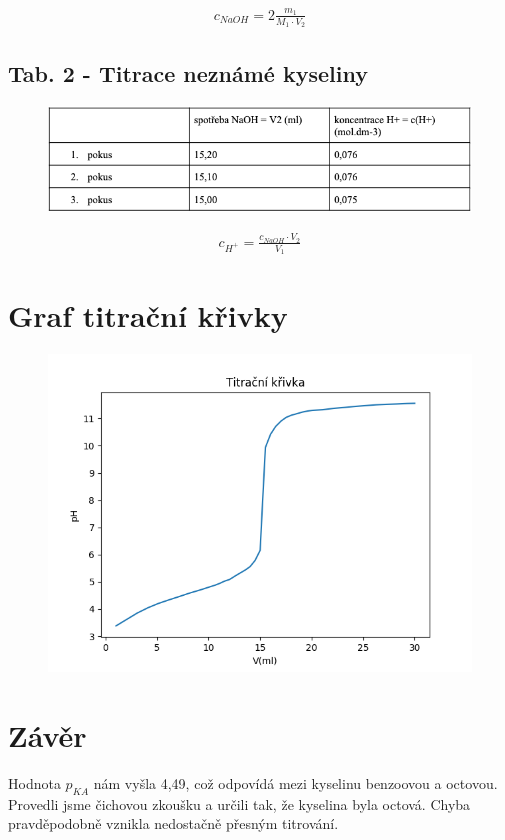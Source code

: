 \documentclass[13pt, a4paper, twoside]{article}
\begin{document}
    \begin{align*}
        c_{NaOH}=2\frac{m_1}{M_1 \cdot V_2}
    \end{align*}

    \subsection*{Tab. 2 - Titrace neznámé kyseliny}
    \begin{figure}[H]
        \centering
        \includegraphics[width=7in]{kys_nez.png}
    \end{figure}
    \begin{align*}
        c_{H^+}=\frac{c_{NaOH}\cdot V_2}{V_1}
    \end{align*}
    \section*{Graf titrační křivky}
    \begin{figure}[H]
        \centering
        \includegraphics[width=5in]{titracni_krivka.png}
    \end{figure}

    \section*{Závěr}
    Hodnota $p_{KA}$ nám vyšla 4,49, což odpovídá mezi kyselinu benzoovou a octovou. Provedli jsme čichovou zkoušku a určili tak, že kyselina byla octová. Chyba pravděpodobně vznikla nedostačně přesným titrování.
\end{document}
